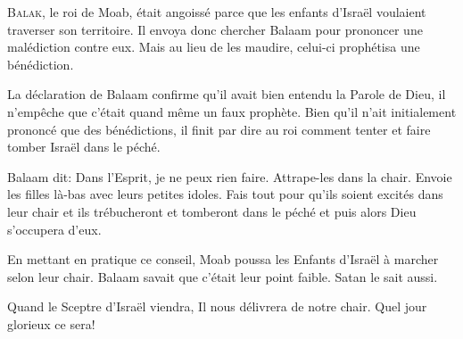 \dvrule







\lettrine{B}{alak}, le roi de Moab, était angoissé parce que
 les enfants d'Israël voulaient traverser son territoire.
 Il envoya donc chercher Balaam pour prononcer une malédiction contre eux.
 Mais au lieu de les maudire, celui-ci prophétisa une bénédiction.

La déclaration de Balaam confirme qu'il avait bien entendu la Parole de Dieu,
 il n'empêche que c'était quand même un faux prophète.
 Bien qu'il n'ait initialement prononcé que des bénédictions,
 il finit par dire au roi comment tenter et faire tomber Israël dans le péché.

Balaam dit:
 \Og Dans l'Esprit, je ne peux rien faire. Attrape-les dans la chair.
 Envoie les filles là-bas avec leurs petites idoles.
 Fais tout pour qu'ils soient excités dans leur chair
 et ils trébucheront et tomberont dans le péché
 \ocadr{}et puis alors Dieu s'occupera d'eux. \Fg{}

En mettant en pratique ce conseil, Moab poussa les Enfants d'Israël
 à marcher selon leur chair.
 Balaam savait que c'était leur point faible. Satan le sait aussi.


Quand le Sceptre d'Israël viendra, Il nous délivrera de notre chair.
 Quel jour glorieux ce sera! 

\dvrule

